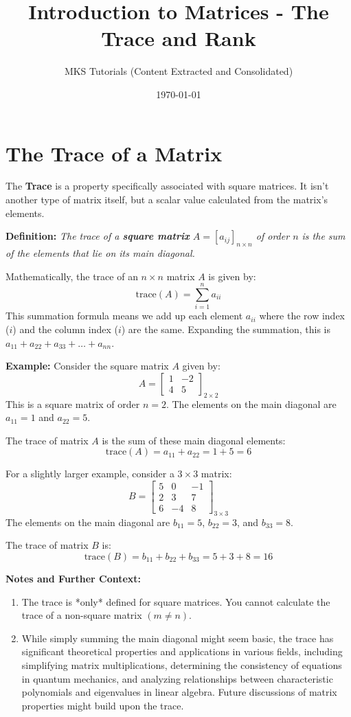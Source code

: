 \documentclass{article}
\title{Introduction to Matrices - The Trace and Rank}
\author{MKS Tutorials (Content Extracted and Consolidated)}
\date{\today}
\begin{document}
\maketitle

\section{The Trace of a Matrix}

The \textbf{Trace} is a property specifically associated with square matrices. It isn't another type of matrix itself, but a scalar value calculated from the matrix's elements.

\textbf{Definition:}
\textit{The trace of a \textbf{square matrix} $A = [a_{ij}]_{n \times n}$ of order $n$ is the sum of the elements that lie on its main diagonal.}

Mathematically, the trace of an $n \times n$ matrix $A$ is given by:
\[ \text{trace}(A) = \sum_{i=1}^{n} a_{ii} \]
This summation formula means we add up each element $a_{ii}$ where the row index ($i$) and the column index ($i$) are the same. Expanding the summation, this is $a_{11} + a_{22} + a_{33} + \dots + a_{nn}$.

\textbf{Example:}
Consider the square matrix $A$ given by:
\[ A = \begin{bmatrix} 1 & -2 \\ 4 & 5 \end{bmatrix}_{2 \times 2} \]
This is a square matrix of order $n=2$. The elements on the main diagonal are $a_{11} = 1$ and $a_{22} = 5$.

The trace of matrix $A$ is the sum of these main diagonal elements:
\[ \text{trace}(A) = a_{11} + a_{22} = 1 + 5 = 6 \]

For a slightly larger example, consider a $3 \times 3$ matrix:
\[ B = \begin{bmatrix} 5 & 0 & -1 \\ 2 & 3 & 7 \\ 6 & -4 & 8 \end{bmatrix}_{3 \times 3} \]
The elements on the main diagonal are $b_{11} = 5$, $b_{22} = 3$, and $b_{33} = 8$.

The trace of matrix $B$ is:
\[ \text{trace}(B) = b_{11} + b_{22} + b_{33} = 5 + 3 + 8 = 16 \]

\textbf{Notes and Further Context:}
\begin{enumerate}
    \item The trace is *only* defined for square matrices. You cannot calculate the trace of a non-square matrix $(m \neq n)$.
    \item While simply summing the main diagonal might seem basic, the trace has significant theoretical properties and applications in various fields, including simplifying matrix multiplications, determining the consistency of equations in quantum mechanics, and analyzing relationships between characteristic polynomials and eigenvalues in linear algebra. Future discussions of matrix properties might build upon the trace.
\end{enumerate}
\end{document}
